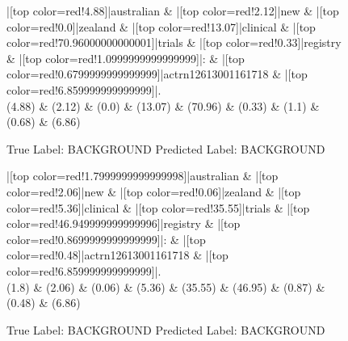 \documentclass[a4paper, landscape]{article}
\begin{document}
\clearpage
\begin{figure}
\begin{center}
\begin{dependency}
\begin{deptext}
|[top color=red!4.88]|australian \& |[top color=red!2.12]|new \& |[top color=red!0.0]|zealand \& |[top color=red!13.07]|clinical \& |[top color=red!70.96000000000001]|trials \& |[top color=red!0.33]|registry \& |[top color=red!1.0999999999999999]|: \& |[top color=red!0.6799999999999999]|actrn12613001161718 \& |[top color=red!6.859999999999999]|.\\
(4.88) \& (2.12) \& (0.0) \& (13.07) \& (70.96) \& (0.33) \& (1.1) \& (0.68) \& (6.86)\\
\end{deptext}
\end{dependency}
\end{center}
\caption{True Label: BACKGROUND Predicted Label: BACKGROUND}
\end{figure}
\clearpage
\begin{figure}
\begin{center}
\begin{dependency}
\begin{deptext}
|[top color=red!1.7999999999999998]|australian \& |[top color=red!2.06]|new \& |[top color=red!0.06]|zealand \& |[top color=red!5.36]|clinical \& |[top color=red!35.55]|trials \& |[top color=red!46.949999999999996]|registry \& |[top color=red!0.8699999999999999]|: \& |[top color=red!0.48]|actrn12613001161718 \& |[top color=red!6.859999999999999]|.\\
(1.8) \& (2.06) \& (0.06) \& (5.36) \& (35.55) \& (46.95) \& (0.87) \& (0.48) \& (6.86)\\
\end{deptext}
\end{dependency}
\end{center}
\caption{True Label: BACKGROUND Predicted Label: BACKGROUND}
\end{figure}
\end{document}

